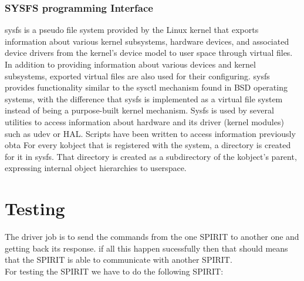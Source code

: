 \subsubsection{SYSFS programming Interface}
sysfs is a pseudo file system provided by the Linux kernel that exports information about various kernel subsystems, hardware devices, and associated device drivers from the kernel's device model to user space through virtual files. In addition to providing information about various devices and kernel subsystems, exported virtual files are also used for their configuring. sysfs provides functionality similar to the sysctl mechanism found in BSD operating systems, with the difference that sysfs is implemented as a virtual file system instead of being a purpose-built kernel mechanism. Sysfs is used by several utilities to access information about hardware and its driver (kernel modules) such as udev or HAL. Scripts have been written to access information previously obta For every kobject that is registered with the system, a directory is created for it in sysfs. That directory is created as a subdirectory of the kobject's parent, expressing internal object hierarchies to userspace. %
\section{Testing}
The driver job is to send the commands from the one SPIRIT to another one and getting back its response. if all this happen sucessfully then that should means that the SPIRIT is able to communicate with another SPIRIT.\\
For testing the SPIRIT we have to do the following SPIRIT:
